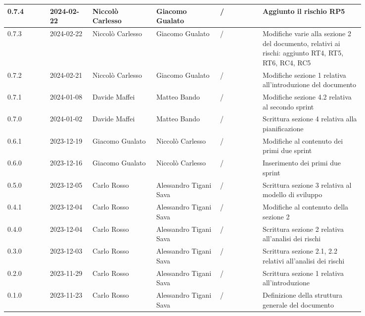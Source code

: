 {\begin{longtable}{p{0.10\linewidth}p{0.10\linewidth}p{0.15\linewidth}p{0.15\linewidth}p{0.10\linewidth}p{0.24\linewidth}}
	  \hline
	  0.7.4             & 2024-02-22    & Niccolò Carlesso   & Giacomo Gualato        & /                    & Aggiunto il rischio RP5                                           \\
	  \hline
	  0.7.3             & 2024-02-22    & Niccolò Carlesso   & Giacomo Gualato        & /                    & Modifiche varie alla sezione 2 del documento, relativi ai rischi:
	  aggiunto RT4, RT5, RT6, RC4, RC5                                                                                                                                           \\
	  \hline
	  0.7.2             & 2024-02-21    & Niccolò Carlesso   & Giacomo Gualato        & /                    & Modifiche sezione 1 relativa all'introduzione del documento       \\
	  \hline
	  0.7.1             & 2024-01-08    & Davide Maffei      & Matteo Bando           & /                    & Modifiche sezione 4.2 relativa al secondo sprint                  \\
	  \hline
	  0.7.0             & 2024-01-02    & Davide Maffei      & Matteo Bando           & /                    & Scrittura sezione 4 relativa alla pianificazione                  \\
	  \hline
	  0.6.1             & 2023-12-19    & Giacomo Gualato    & Niccolò Carlesso       & /                    & Modifiche al contenuto dei primi due sprint                       \\
	  \hline
	  0.6.0             & 2023-12-16    & Giacomo Gualato    & Niccolò Carlesso       & /                    & Inserimento dei primi due sprint                                  \\
	  \hline
	  0.5.0             & 2023-12-05    & Carlo Rosso        & Alessandro Tigani Sava & /                    & Scrittura sezione 3 relativa al modello di sviluppo               \\
	  \hline
	  0.4.1             & 2023-12-04    & Carlo Rosso        & Alessandro Tigani Sava & /                    & Modifiche al contenuto della sezione 2                            \\
	  \hline
	  0.4.0             & 2023-12-04    & Carlo Rosso        & Alessandro Tigani Sava & /                    & Scrittura sezione 2 relativa all'analisi dei rischi               \\
	  \hline
	  0.3.0             & 2023-12-03    & Carlo Rosso        & Alessandro Tigani Sava & /                    & Scrittura sezione 2.1, 2.2 relativi all'analisi dei rischi        \\
	  \hline
	  0.2.0             & 2023-11-29    & Carlo Rosso        & Alessandro Tigani Sava & /                    & Scrittura sezione 1 relativa all'introduzione                     \\
	  \hline
	  0.1.0             & 2023-11-23    & Carlo Rosso        & Alessandro Tigani Sava & /                    & Definizione della struttura generale del documento                \\
	  \bottomrule
  \end{longtable}
 }
